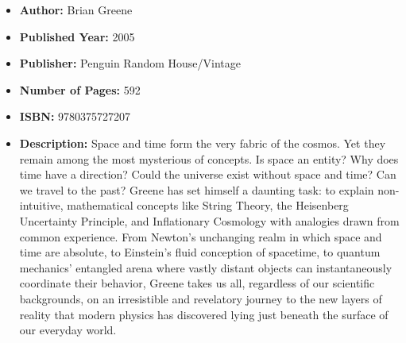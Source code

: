 \documentclass{tufte-handout}
\begin{document}
\begin{itemize}
    \item[] \textbf{Author:} Brian Greene
    \item[] \textbf{Published Year:} 2005
    \item[] \textbf{Publisher:} Penguin Random House/Vintage
    \item[] \textbf{Number of Pages:} 592
    \item[] \textbf{ISBN:} 9780375727207
    \item[] \textbf{Description:} Space and time form the very fabric of the cosmos. Yet they remain among the most mysterious of concepts. Is space an entity? Why does time have a direction? Could the universe exist without space and time? Can we travel to the past? Greene has set himself a daunting task: to explain non-intuitive, mathematical concepts like String Theory, the Heisenberg Uncertainty Principle, and Inflationary Cosmology with analogies drawn from common experience. From Newton’s unchanging realm in which space and time are absolute, to Einstein’s fluid conception of spacetime, to quantum mechanics’ entangled arena where vastly distant objects can instantaneously coordinate their behavior, Greene takes us all, regardless of our scientific backgrounds, on an irresistible and revelatory journey to the new layers of reality that modern physics has discovered lying just beneath the surface of our everyday world.
\end{itemize}
\end{document}
